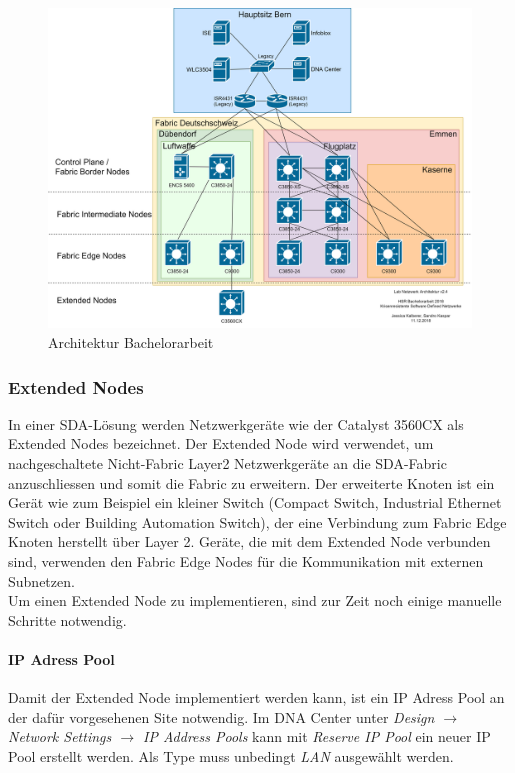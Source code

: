 \begin{figure}[H]
	\centering
	\includegraphics[width=1\linewidth]{img/Architecture/LabNetworkArchitecture-11-12}
	\caption{Architektur Bachelorarbeit}
	\label{fig:Architektur Bachelorarbeit}
\end{figure}




\subsubsection{Extended Nodes}
In einer SDA-Lösung werden Netzwerkgeräte wie der Catalyst 3560CX als Extended Nodes bezeichnet. Der  Extended Node wird verwendet, um nachgeschaltete Nicht-Fabric Layer2 Netzwerkgeräte an die SDA-Fabric anzuschliessen und somit die Fabric zu erweitern.
Der erweiterte Knoten ist ein Gerät wie zum Beispiel ein kleiner Switch (Compact Switch, Industrial Ethernet Switch oder Building Automation Switch), der eine Verbindung zum Fabric Edge Knoten herstellt
über Layer 2. Geräte, die mit dem Extended Node verbunden sind, verwenden den Fabric Edge Nodes für die Kommunikation mit externen Subnetzen.  \\

Um einen Extended Node zu implementieren, sind zur Zeit noch einige manuelle Schritte notwendig.

\paragraph{IP Adress Pool} Damit der Extended Node implementiert werden kann, ist ein IP Adress Pool an der dafür vorgesehenen Site notwendig. Im DNA Center unter \textit{Design $\rightarrow$ Network Settings $\rightarrow$ IP Address Pools} kann mit \textit{Reserve IP Pool} ein neuer IP Pool erstellt werden. Als Type muss unbedingt \textit{LAN} ausgewählt werden.

